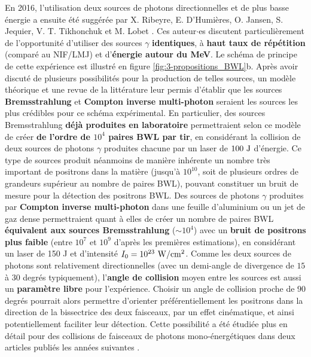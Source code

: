 \begin{refsection}
En 2016, l'utilisation deux sources de photons directionnelles et de plus basse énergie a ensuite été suggérée par X. Ribeyre, E. D’Humières, O. Jansen, S. Jequier, V. T. Tikhonchuk et M. Lobet \parencite{ribeyre_2016}.
Ces auteur$\cdot$es discutent particulièrement de l'opportunité d'utiliser des sources $\gamma$ \textbf{identiques}, à \textbf{haut taux de répétition} (comparé au NIF/LMJ) et d'\textbf{énergie autour du MeV}. Le schéma de principe de cette expérience est illustré en figure \ref{fig:3-propositions_BWL}b. Après avoir discuté de plusieurs possibilités pour la production de telles sources, un modèle théorique et une revue de la littérature leur permis d'établir que les sources \textbf{Bremsstrahlung} et \textbf{Compton inverse multi-photon} seraient les sources les plus crédibles pour ce schéma expérimental. En particulier, des sources Bremsstrahlung \textbf{déjà produites en laboratoire} permettraient selon ce modèle de créer \textbf{de l'ordre de $10^4$ paires BWL par tir}, en considérant la collision de deux sources de photons $\gamma$ produites chacune par un laser de $100 ~ \rm J$ d'énergie. Ce type de sources produit néanmoins de manière inhérente un nombre très important de positrons dans la matière (jusqu'à $10^{10}$, soit de plusieurs ordres de grandeurs supérieur au nombre de paires BWL), pouvant constituer un bruit de mesure pour la détection des positrons BWL. Des sources de photons $\gamma$ produites par \textbf{Compton inverse multi-photon} dans une feuille d'aluminium ou un jet de gaz dense permettraient quant à elles de créer un nombre de paires BWL \textbf{équivalent aux sources Bremsstrahlung} ($\sim 10^4$) avec un \textbf{bruit de positrons plus faible} (entre $10^7$ et $10^9$ d'après les premières estimations), en considérant un laser de 150 J et d'intensité $I_0=10^{23} ~ \rm W/cm^2$. Comme les deux sources de photons sont relativement directionnelles (avec un demi-angle de divergence de $15$ à $30$ degrés typiquement), l'\textbf{angle de collision} moyen entre les sources est aussi un \textbf{paramètre libre} pour l'expérience. Choisir un angle de collision proche de $90$ degrés pourrait alors permettre d'orienter préférentiellement les positrons dans la direction de la bissectrice des deux faisceaux, par un effet cinématique, et ainsi potentiellement faciliter leur détection. Cette possibilité a été étudiée plus en détail pour des collisions de faisceaux de photons mono-énergétiques dans deux articles publiés les années suivantes \parencite{ribeyre_2017, ribeyre_2018}.



\end{refsection}
